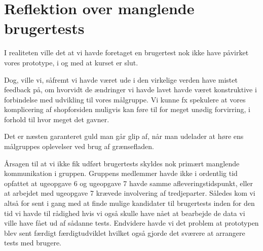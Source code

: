 \section{Reflektion over manglende brugertests}

I realiteten ville det at vi havde foretaget en brugertest nok ikke have
påvirket vores prototype, i og med at kurset er slut.

Dog, ville vi, såfremt vi havde været ude i den virkelige verden have
mistet feedback på, om hvorvidt de ændringer vi havde lavet havde været
konstruktive i forbindelse med udvikling til vores målgruppe. Vi kunne fx
spekulere at vores komplicering af shopforsiden muligvis kan føre til for
meget unødig forvirring, i forhold til hvor meget det gavner.

Det er næsten garanteret guld man går glip af, når man udelader at høre
ens målgruppes oplevelser ved brug af grænsefladen.

Årsagen til at vi ikke fik udført brugertests skyldes nok primært manglende
kommunikation i gruppen. Gruppens medlemmer havde ikke i ordentlig tid
opfattet at ugeopgave 6 og ugeopgave 7 havde samme afleveringstidspunkt, eller
at arbejdet med ugeopgave 7 krævede involvering af tredjeparter. Således
kom vi altså for sent i gang med at finde mulige kandidater til brugertests
inden for den tid vi havde til rådighed hvis vi også skulle have nået at
bearbejde de data vi ville have fået ud af sådanne tests. Endvidere havde vi
det problem at prototypen blev sent færdigt færdigtudviklet hvilket også
gjorde det sværere at arrangere tests med brugere.
